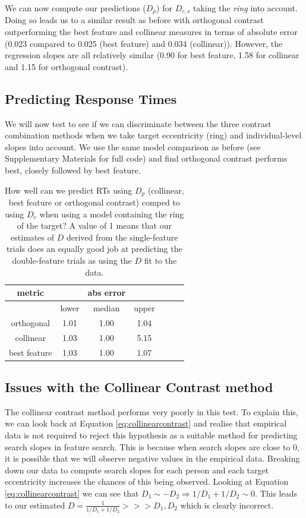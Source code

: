 \documentclass[preprint,12pt,authoryear]{elsarticle}
\begin{document}
We can now compute our predictions ($D_p$) for $D_{c,s}$ taking the \textit{ring} into account. Doing so leads us to a similar result as before with orthogonal contrast outperforming the best feature and collinear measures in terms of absolute error (0.023 compared to 0.025 (best feature) and 0.034 (collinear)). However, the regression slopes are all relatively similar (0.90 for best feature, 1.58 for collinear and 1.15 for orthogonal contrast).

\subsection{Predicting Response Times}

We will now test to see if we can discriminate between the three contrast combination methods when we take target eccentricity (ring) and individual-level slopes into account. We use the same model comparison as before (see Supplementary Materials for full code) and find orthogonal contrast performs best, closely followed by best feature. 

\begin{table}[h]
\centering
\begin{tabular}{c|ccc|ccc} 
\hline
metric & & abs error & &   \\
 \hline
  & lower  & median & upper \\
 
orthogonal & 1.01 & 1.00 & 1.04 \\
collinear & 1.03 & 1.00 & 5.15\\ 
best feature  & 1.03 & 1.00 & 1.07 \\
 \end{tabular}
\caption{How well can we predict RTs using $D_p$ (collinear, best feature or orthogonal contrast) comped to using $D_e$ when using a model containing the ring of the target? A value of 1 means that our estimates of $D$ derived from the single-feature trials does an equally good job at predicting the double-feature trials as using the $D$ fit to the data.}
\label{tab:new_pred_rt_ring}
\end{table}

\subsection{Issues with the Collinear Contrast method}
The collinear contrast method performs very poorly in this test. To explain this, we can look back at Equation \ref{eq:collinearcontrast} and realise that empirical data is not required to reject this hypothesis as a suitable method for predicting search slopes in feature search. This is because when search slopes are close to 0, it is possible that we will observe negative values in the empirical data. Breaking down our data to compute search slopes for each person and each target eccentricity increases the chances of this being observed. Looking at Equation \ref{eq:collinearcontrast} we can see that $D_1 \sim -D_2\Rightarrow 1/D_1 + 1/D_2 \sim 0$. This leads to our estimated $D = \frac{1}{1/D_1 + 1/D_2} >>> D_1, D_2$ which is clearly incorrect. 
\end{document}

